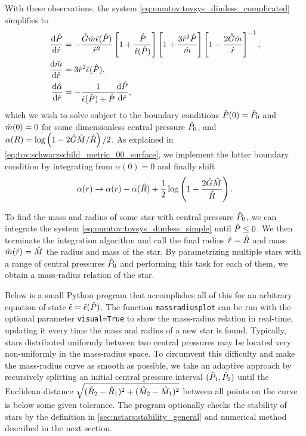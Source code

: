 With these observations, the system \eqref{eq:numtov:tovsys_dimless_complicated} simplifies to
\begin{subequations}
\label{eq:numtov:tovsys_dimless_simple}
\begin{align}
	\odv{\diml{P}}{\diml{r}} &= - \frac{\diml{G} \diml{m} \diml{\epsilon}(\diml{P})}{\diml{r}^2} \left[ 1 + \frac{\diml{P}}{\diml{\epsilon}(\diml{P})} \right] \left[ 1 + \frac{3 \diml{r}^3 \diml{P}}{\diml{m}} \right] \left[ 1 - \frac{2 \diml{G} \diml{m}}{\diml{r}} \right]^{-1} , \\
	\odv{\diml{m}}{\diml{r}} &= 3 \diml{r}^2 \diml{\epsilon}(\diml{P}) , \\
	\odv{\diml{\alpha}}{\diml{r}} &= -\frac{1}{\diml{\epsilon}(\diml{P})+\diml{P}} \odv{\diml{P}}{\diml{r}} ,
\end{align}
\end{subequations}
which we wish to solve subject to the boundary conditions $\hat{P}(0) = \hat{P}_0$ and $\hat{m}(0) = 0$ for some dimensionless central pressure $\hat{P}_0$, and $\alpha(R) = \log \left( 1 - 2 \hat{G} \hat{M} / \hat{R} \right) / 2$.
As explained in \cref{eq:tov:schwarzschild_metric_00_surface}, we implement the latter boundary condition by integrating from $\alpha(0) = 0$ and finally shift
\begin{equation}
	\alpha(r) \rightarrow \alpha(r) - \alpha(\hat{R}) + \frac12 \log \left( 1 - \frac{2 \hat{G} \hat{M} }{ \hat{R}} \right) .
\end{equation}

To find the mass and radius of some star with central pressure $\hat{P}_0$, we can integrate the system \eqref{eq:numtov:tovsys_dimless_simple} until $\hat{P} \le 0$.
We then terminate the integration algorithm and call the final radius $\hat{r} = \hat{R}$ and mass $\hat{m}(\hat{r}) = \hat{M}$ the radius and mass of the star.
By parametrizing multiple stars with a range of central pressures $\hat{P}_0$ and performing this task for each of them, we obtain a mass-radius relation of the star.

Below is a small Python program that accomplishes all of this for an arbitrary equation of state $\hat{\epsilon} = \hat{\epsilon}(\hat{P})$.
The function \verb|massradiusplot| can be run with the optional parameter \verb|visual=True| to show the mass-radius relation in real-time, updating it every time the mass and radius of a new star is found.
Typically, stars distributed uniformly between two central pressures may be located very non-uniformly in the mass-radius space.
To circumvent this difficulty and make the mass-radius curve as smooth as possible, we take an adaptive approach by recursively splitting an initial central pressure interval $(\hat{P}_1, \hat{P}_2)$ until the Euclidean distance $\sqrt{(\hat{R}_2-\hat{R}_1)^2 + (\hat{M}_2-\hat{M}_1)^2}$ between all points on the curve is below some given tolerance.
The program optionally checks the stability of stars by the definition in \cref{sec:nstars:stability_general} and numerical method described in the next section.

